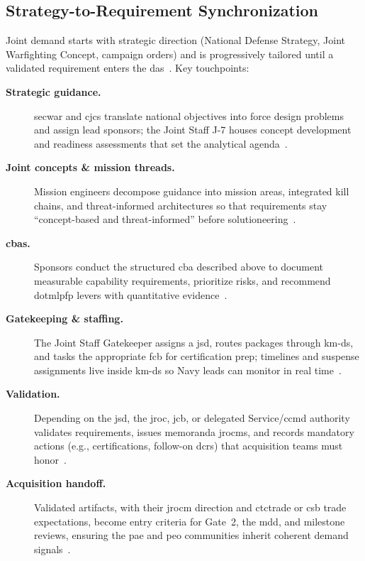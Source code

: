 \documentclass[../main.tex]{subfiles}
\begin{document}
\subsection{Strategy-to-Requirement Synchronization}
Joint demand starts with strategic direction (National Defense Strategy, Joint Warfighting Concept, campaign orders) and is progressively tailored until a validated requirement enters the \ac{das}~\autocite{jcids-manual-2021,edo-3-3-3-jcids-2025}. Key touchpoints:
\begin{description}
  \item[\textbf{Strategic guidance.}] \ac{secwar} and \ac{cjcs} translate national objectives into force design problems and assign lead sponsors; the Joint Staff J-7 houses concept development and readiness assessments that set the analytical agenda~\autocite{jcids-manual-2021}.
  \item[\textbf{Joint concepts \& mission threads.}] Mission engineers decompose guidance into mission areas, integrated kill chains, and threat-informed architectures so that requirements stay ``concept-based and threat-informed'' before solutioneering~\autocite[Encl.~A]{jcids-manual-2021}.
  \item[\textbf{\acp{cba}.}] Sponsors conduct the structured \ac{cba} described above to document measurable capability requirements, prioritize risks, and recommend \ac{dotmlpfp} levers with quantitative evidence~\autocite{jcids-manual-2021}.
  \item[\textbf{Gatekeeping \& staffing.}] The Joint Staff Gatekeeper assigns a \ac{jsd}, routes packages through \ac{km-ds}, and tasks the appropriate \ac{fcb} for certification prep; timelines and suspense assignments live inside \ac{km-ds} so Navy leads can monitor in real time~\autocite{jcids-manual-2021}.
  \item[\textbf{Validation.}] Depending on the \ac{jsd}, the \ac{jroc}, \ac{jcb}, or delegated Service/\ac{ccmd} authority validates requirements, issues memoranda \acp{jrocm}, and records mandatory actions (e.g., certifications, follow-on \acp{dcr}) that acquisition teams must honor~\autocite{jcids-manual-2021,USC-10-181}.
  \item[\textbf{Acquisition handoff.}] Validated artifacts, with their \ac{jrocm} direction and \ac{ctctrade} or \ac{csb} trade expectations, become entry criteria for Gate~2, the \ac{mdd}, and milestone reviews, ensuring the \ac{pae} and \ac{peo} communities inherit coherent demand signals~\autocite{edo-3-3-3-jcids-2025}.
\end{description}
\end{document}
